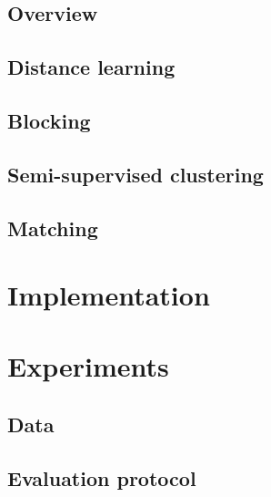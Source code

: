 \documentclass{article}
\begin{document}
\subsection{Overview}

\subsection{Distance learning}

\subsection{Blocking}

\subsection{Semi-supervised clustering}

\subsection{Matching}



\section{Implementation}
\label{implementation}



\section{Experiments}
\label{experiments}

\subsection{Data}

\subsection{Evaluation protocol}
\end{document}
